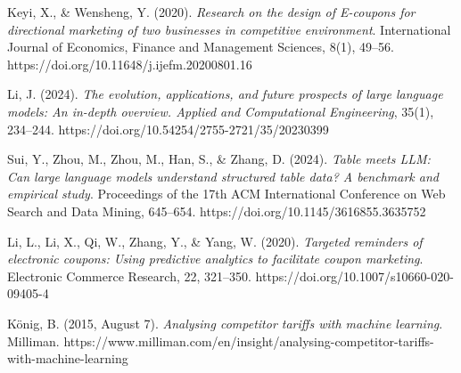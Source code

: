 \documentclass[licencjacka,en]{pracamgr}
\begin{document}
\begin{thebibliography}{99}
Keyi, X., \& Wensheng, Y. (2020). \textit{Research on the design of E-coupons for directional marketing of two businesses in competitive environment}. International Journal of Economics, Finance and Management Sciences, 8(1), 49–56. https://doi.org/10.11648/j.ijefm.20200801.16

Li, J. (2024). \textit{The evolution, applications, and future prospects of large language models: An in-depth overview. Applied and Computational Engineering}, 35(1), 234–244. https://doi.org/10.54254/2755-2721/35/20230399

Sui, Y., Zhou, M., Zhou, M., Han, S., \& Zhang, D. (2024). \textit{Table meets LLM: Can large language models understand structured table data? A benchmark and empirical study}. Proceedings of the 17th ACM International Conference on Web Search and Data Mining, 645–654. https://doi.org/10.1145/3616855.3635752

Li, L., Li, X., Qi, W., Zhang, Y., \& Yang, W. (2020). \textit{Targeted reminders of electronic coupons: Using predictive analytics to facilitate coupon marketing}. Electronic Commerce Research, 22, 321–350. https://doi.org/10.1007/s10660-020-09405-4

König, B. (2015, August 7). \textit{Analysing competitor tariffs with machine learning}. Milliman. https://www.milliman.com/en/insight/analysing-competitor-tariffs-with-machine-learning


\end{thebibliography}
\end{document}
